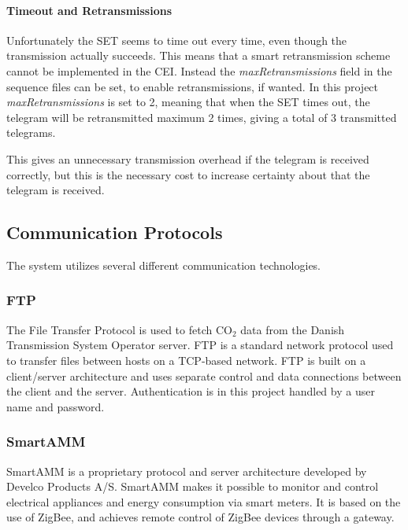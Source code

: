 \documentclass[Main]{subfiles}
\begin{document}
			\paragraph{Timeout and Retransmissions} %
			\label{par:timeout_and_retransmissions}
				Unfortunately the SET seems to time out every time, even though the transmission actually succeeds.
				This means that a smart retransmission scheme cannot be implemented in the CEI. 
				Instead the \emph{maxRetransmissions} field in the sequence files can be set, to enable retransmissions, if wanted. 
				In this project \emph{maxRetransmissions} is set to 2, meaning that when the SET times out, the telegram will be retransmitted maximum 2 times, giving a total of 3 transmitted telegrams.

				This gives an unnecessary transmission overhead if the telegram is received correctly, but this is the necessary cost to increase certainty about that the telegram is received.

	\newpage
	\subsection{Communication Protocols}
		The system utilizes several different communication technologies.

		\subsubsection{FTP}
			The File Transfer Protocol is used to fetch CO$_2$ data from the Danish Transmission System Operator server.
			FTP is a standard network protocol used to transfer files between hosts on a TCP-based network\cite{FTPWikipedia:Online}.
			FTP is built on a client/server architecture and uses separate control and data connections between the client and the server\cite{TCPIPProtocol}.
			Authentication is in this project handled by a user name and password.  


		\subsubsection{SmartAMM}
			SmartAMM is a proprietary protocol and server architecture developed by Develco Products A/S. 
			SmartAMM makes it possible to monitor and control electrical appliances and energy consumption via smart meters.
			It is based on the use of ZigBee, and achieves remote control of ZigBee devices through a gateway\cite{SmartAMM:Online}.
\end{document}
